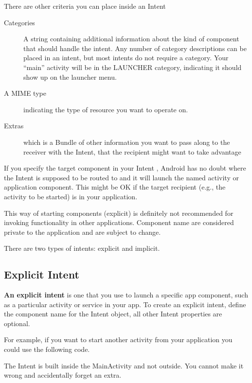 There are other criteria you can place inside an Intent
\begin{description}
	\item[Categories] A string containing additional information about the kind of component that should handle the intent.
	Any number of category descriptions can be placed in an intent, but most intents do not require a category.
	Your “main” activity will be in the LAUNCHER category, indicating it should show up on the launcher menu.
	\item[A MIME type]  indicating the type of resource you want to operate on.
	\item[Extras] which is a Bundle of other information you want to pass along to the receiver with the Intent, that the recipient might want to take advantage
\end{description}

If you specify the target component in your Intent , Android has no doubt where the Intent is supposed to be routed to and it will launch the named activity or application component.
This might be OK if the target recipient (e.g., the activity to be started) is in your application.

\begin{framed}
		This way of starting components (explicit) is definitely not recommended for invoking functionality in other applications.
		Component name are considered private to the application and are subject to change.
\end{framed}

There are two types of intents: explicit and implicit.

\subsection{Explicit Intent}
\textbf{An explicit intent} is one that you use to launch a specific app component, such as a particular activity or service in your app.
To create an explicit intent, define the component name for the Intent object, all other Intent properties are optional.

For example, if you want to start another activity from your application you could use the following code. 



The Intent is built inside the MainActivity and not outside. You cannot make it wrong and accidentally forget an extra. 

